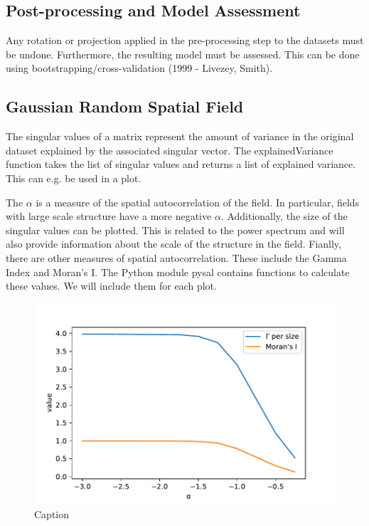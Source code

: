 \documentclass{acm_proc_article-sp}
\begin{document}
\subsection{Post-processing and Model Assessment}
\label{sec:Introduction Post-processing and Model Assessment}

Any rotation or projection applied in the pre-processing step to the datasets must be undone. Furthermore, the resulting model must be assessed. This can be done using bootstrapping/cross-validation (1999 - Livezey, Smith).

\subsection{Gaussian Random Spatial Field}
\label{sec:Introduction Gaussian Random Spatial Field}

The singular values of a matrix represent the amount of variance in the original dataset explained by the associated singular vector. The explainedVariance function takes the list of singular values and returns a list of explained variance. This can e.g. be used in a plot.

The $\alpha$ is a measure of the spatial autocorrelation of the field. In particular, fields with large scale structure have a more negative $\alpha$. Additionally, the size of the singular values can be plotted. This is related to the power spectrum and will also provide information about the scale of the structure in the field. Fianlly, there are other measures of spatial autocorrelation. These include the Gamma Index and Moran's I. The Python module pysal contains functions to calculate these values. We will include them for each plot.

\begin{figure}[h]
\begin{center}
\includegraphics[scale=0.5]{Results/plotGammaAndMoransI.pdf}
\caption[Small caption]{Caption}
\label{fig:plotGammaAndMoransI}
\end{center}
\end{figure}
\end{document}

